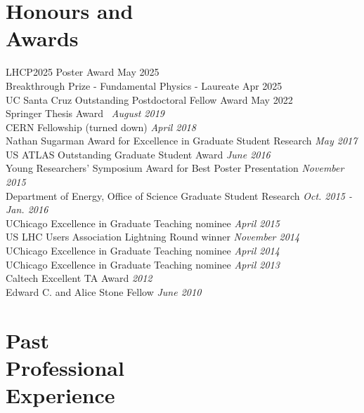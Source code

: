 \documentclass[margin,line]{resume}
\let\origsection\section%
\let\section\subsection%
\let\section\origsection%
\begin{document}
\begin{resume}
\section{\mysidestyle Honours and\\Awards}

LHCP2025 Poster Award \hfill{May 2025}\\
Breakthrough Prize - Fundamental Physics - Laureate \hfill{Apr 2025}\\
UC Santa Cruz Outstanding Postdoctoral Fellow Award \hfill{May 2022}\\
Springer Thesis Award~\cite{Stark2020} \hfill \textsl{August 2019}\\
CERN Fellowship (turned down) \hfill \textsl{April 2018}\\
Nathan Sugarman Award for Excellence in Graduate Student Research \hfill \textsl{May 2017}\\
US ATLAS Outstanding Graduate Student Award \hfill \textsl{June 2016}\\
Young Researchers' Symposium Award for Best Poster Presentation \hfill \textsl{November 2015}\\
Department of Energy, Office of Science Graduate Student Research \hfill \textsl{Oct. 2015 - Jan. 2016}\\
UChicago Excellence in Graduate Teaching nominee \hfill \textsl{April 2015}\\
US LHC Users Association Lightning Round winner \hfill \textsl{November 2014}\\
UChicago Excellence in Graduate Teaching nominee \hfill \textsl{April 2014}\\
UChicago Excellence in Graduate Teaching nominee \hfill \textsl{April 2013}\\
Caltech Excellent TA Award \hfill \textsl{2012}\\
Edward C. and Alice Stone Fellow \hfill \textsl{June 2010}


\newpage

\section{\mysidestyle Past\\Professional\\Experience}


\end{resume}
\end{document}
